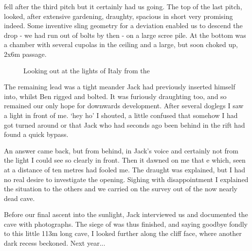  fell after the third pitch but it certainly had us going. The top of the last pitch, looked, after extensive gardening, draughty, spacious in short very promising indeed. Some inventive sling geometry for a deviation enabled us to descend the drop - we had run out of bolts by then -  on a large scree pile.  At the bottom was a chamber with several cupolas in the ceiling and a large, but soon choked up, 2x6m passage. 



\begin{figure}[t!]
	\checkoddpage \ifoddpage \forcerectofloat \else \forceversofloat \fi
	\centering
  	\caption{Looking out at the lights of Italy from the \protect{} }
\end{figure}

The remaining lead was a tight meander Jack had previously inserted himself into, whilst Ben rigged and bolted. It was furiously draughting too, and so remained our only hope for downwards development. After several doglegs I saw a light in front of me. `hey ho' I shouted, a little confused that somehow I had got turned around or that Jack who had seconds ago been behind in the rift had found a quick bypass. 

An answer came back, but from behind, in Jack's voice and certainly not from the light I could see so clearly in front. Then it dawned on me that e which, seen at a distance of ten metres had fooled me. The draught was explained, but I had no real desire to investigate the opening. Sighing with disappointment I explained the situation to the others and we carried on the survey out of the now nearly dead cave. 

Before our final ascent into the sunlight, Jack interviewed us and documented the cave with photographs. The siege of  was thus finished, and saying goodbye fondly to this little 113m long cave, I looked further along the cliff face, where another dark recess beckoned. Next year...

